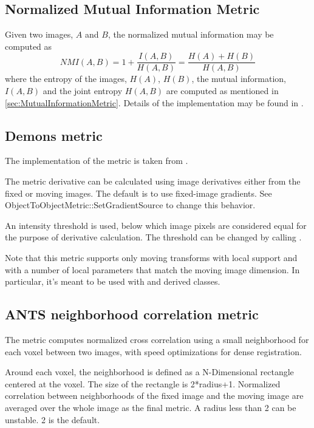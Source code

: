 \subsection{Normalized Mutual Information Metric}
Given two images, $A$ and $B$, the normalized mutual information may be computed as
\begin{equation}
NMI(A,B) = 1 + \frac{I(A,B)}{H(A,B)} = \frac{H(A) + H(B)}{H(A,B)}
\end{equation}
where the entropy of the images, $H(A)$, $H(B)$, the mutual
information, $I(A,B)$ and the joint entropy $H(A,B)$ are computed as mentioned
in \ref{sec:MutualInformationMetric}. Details of the implementation may be found in
\cite{Hajnal2001}.

\subsection{Demons metric}

The implementation of the  metric is taken from
.

The metric derivative can be calculated using image derivatives
either from the fixed or moving images. The default is to use fixed-image
gradients. See ObjectToObjectMetric::SetGradientSource to change
this behavior.

An intensity threshold is used, below which image pixels are considered
equal for the purpose of derivative calculation. The threshold can be
changed by calling .

Note that this metric supports only moving transforms with local support and
with a number of local parameters that match the moving image dimension.
In particular, it's meant to be used with 
and derived classes.


\subsection{ANTS neighborhood correlation metric}

The  metric computes
normalized cross correlation using a small neighborhood for each voxel between
two images, with speed optimizations for dense registration.

Around each voxel, the neighborhood is defined as a N-Dimensional
rectangle centered at the voxel. The size of the rectangle is 2*radius+1.
Normalized correlation between neighborhoods of the fixed image and the moving
image are averaged over the whole image as the final metric.
A radius less than 2 can be unstable. 2 is the default.
